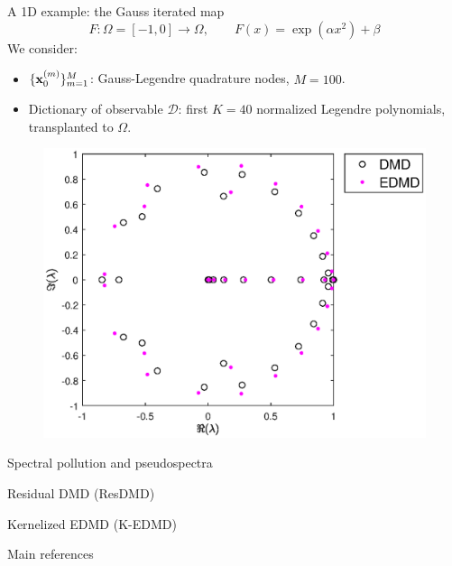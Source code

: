 \documentclass{beamer}
\begin{document}
\begin{frame}{A 1D example: the Gauss iterated map}
\begin{equation}
    F:\Omega = [-1, 0] \to\Omega, \qquad F(x) =\exp(\alpha x^2) + \beta 
\end{equation}
We consider:
\begin{itemize}
    \item $\{\vb{x}_0^{(m)}\}_{m = 1}^M$: Gauss-Legendre quadrature nodes, $M = 100$.
    \item Dictionary of observable $\mathcal{D}$: first $K = 40$ normalized Legendre polynomials, transplanted to $\Omega$.
\end{itemize}
\begin{figure}[h]
    \centering
    \includegraphics[width=0.5\linewidth]{../code/figures/gauss_map/presentation.eps}
\end{figure}
\end{frame}

\begin{frame}{Spectral pollution and pseudospectra}
    
\end{frame}

\begin{frame}{Residual DMD (ResDMD)}
    
\end{frame}

\begin{frame}{Kernelized EDMD (K-EDMD)}
    
\end{frame}
\begin{frame}{Main references}
\nocite{*}
\printbibliography
\end{frame}
\end{document}
